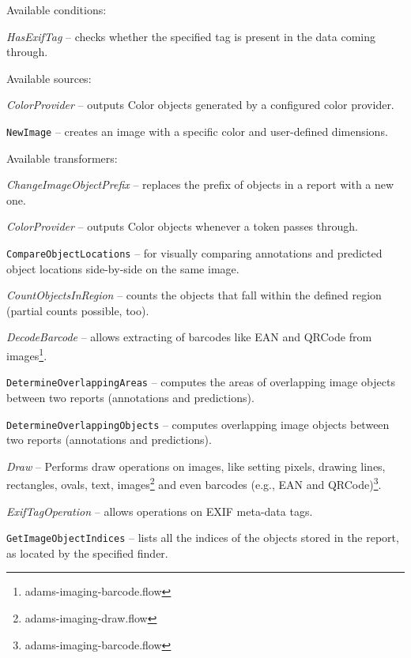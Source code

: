 \documentclass[a4paper]{book}
\begin{document}
\noindent Available conditions:
\begin{tight_itemize}
  \item \textit{HasExifTag} -- checks whether the specified tag is present in
  the data coming through.
\end{tight_itemize}

\noindent Available sources:
\begin{tight_itemize}
  \item \textit{ColorProvider} -- outputs Color objects generated by a
  configured color provider.
  \item \texttt{NewImage} -- creates an image with a specific color and
  user-defined dimensions.
\end{tight_itemize}

\noindent Available transformers:
\begin{tight_itemize}
  \item \textit{ChangeImageObjectPrefix} -- replaces the prefix of
  objects in a report with a new one.
  \item \textit{ColorProvider} -- outputs Color objects whenever a token
  passes through.
  \item \texttt{CompareObjectLocations} -- for visually comparing annotations
  and predicted object locations side-by-side on the same image.
  \item \textit{CountObjectsInRegion} -- counts the objects that fall
  within the defined region (partial counts possible, too).
  \item \textit{DecodeBarcode} -- allows extracting of barcodes like
  EAN and QRCode from images\footnote{adams-imaging-barcode.flow}.
  \item \texttt{DetermineOverlappingAreas} -- computes the areas of overlapping image objects
  between two reports (annotations and predictions).
  \item \texttt{DetermineOverlappingObjects} -- computes overlapping image objects
  between two reports (annotations and predictions).
  \item \textit{Draw} -- Performs draw operations on images, like setting
  pixels, drawing lines, rectangles, ovals, text, images\footnote{adams-imaging-draw.flow}
  and even barcodes (e.g., EAN and QRCode)\footnote{adams-imaging-barcode.flow}.
  \item \textit{ExifTagOperation} -- allows operations on EXIF meta-data tags.
  \item \texttt{GetImageObjectIndices} -- lists all the indices of the objects
  stored in the report, as located by the specified finder.

\end{tight_itemize}
\end{document}

